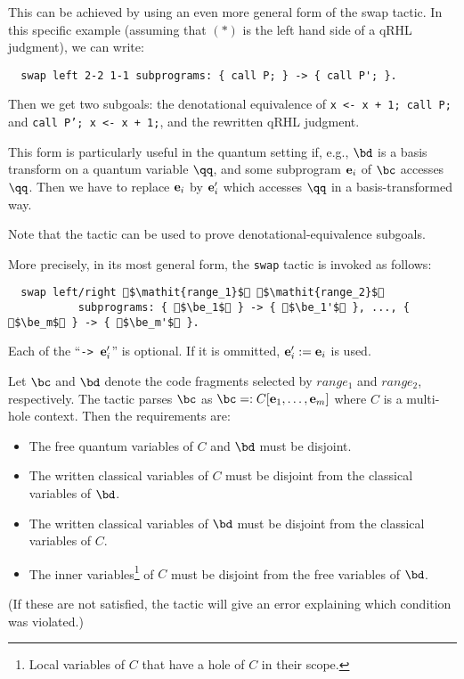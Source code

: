 \documentclass{article}
\begin{document}
This can be achieved by using an even more general form of the swap tactic.
In this specific example (assuming that $(*)$ is the left hand side of a qRHL judgment), we can write:
\begin{lstlisting}
  swap left 2-2 1-1 subprograms: { call P; } -> { call P'; }.
\end{lstlisting}
Then we get two subgoals: the denotational equivalence of \texttt{x <- x + 1; call P;} and \texttt{call P'; x <- x + 1;}, and the rewritten qRHL judgment.

\medskip

This form is particularly useful in the quantum setting if, e.g., $\bd$ is a basis transform on a quantum variable $\qq$, and some subprogram $\mathbf e_i$ of $\bc$ accesses $\qq$.
Then we have to replace $\mathbf e_i$ by $\mathbf e_i'$ which accesses $\qq$ in a basis-transformed way.

Note that the  tactic can be used to prove denotational-equivalence subgoals.

\medskip

More precisely, in its most general form, the \texttt{swap} tactic is invoked as follows:
\begin{lstlisting}
  swap left/right $\mathit{range_1}$ $\mathit{range_2}$
           subprograms: { $\be_1$ } -> { $\be_1'$ }, ..., { $\be_m$ } -> { $\be_m'$ }.
\end{lstlisting}
Each of the ``\texttt{-> $\mathbf e_i'$}'' is optional. If it is ommitted, $\mathbf e_i':=\mathbf e_i$ is used.

Let $\bc$ and $\bd$ denote the code fragments selected by $\mathit{range_1}$ and $\mathit{range_2}$, respectively.
The tactic parses $\bc$ as $\bc=:C[\be_1,\dots,\be_m]$ where $C$ is a multi-hole context. Then the requirements are:
\begin{itemize}
\item The free quantum variables of $C$ and $\bd$ must be disjoint.
\item The written classical variables of $C$ must be disjoint from the classical variables of $\bd$.
\item The written classical variables of $\bd$ must be disjoint from the classical variables of $C$.
\item The inner variables\footnote{Local variables of $C$ that have a hole of $C$ in their scope.} of $C$ must be disjoint from the free variables of $\bd$.
\end{itemize}
(If these are not satisfied, the tactic will give an error explaining which condition was violated.)
\end{document}
